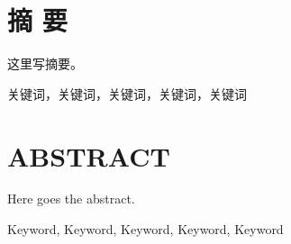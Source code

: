 
\chapter*{\textbf{\songti 摘 \qquad 要}}
\thispagestyle{noheader}

这里写摘要。\zhlipsum[1-4] %

\bigskip %

关键词，关键词，关键词，关键词，关键词


\chapter*{\textbf{ABSTRACT}}
\thispagestyle{noheader}

Here goes the abstract. \lipsum[1-5] %

\bigskip %

Keyword, Keyword, Keyword, Keyword, Keyword
